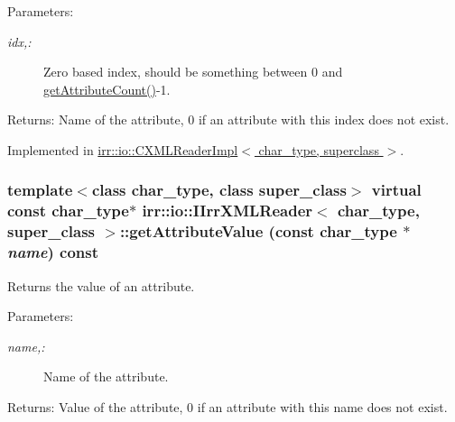 \begin{Desc}
\item[Parameters:]
\begin{description}
\item[{\em idx,:}]Zero based index, should be something between 0 and \hyperlink{classirr_1_1io_1_1_i_irr_x_m_l_reader_eaa1cfc860be7b788f78edec403cc2a2}{getAttributeCount()}-1. \end{description}
\end{Desc}
\begin{Desc}
\item[Returns:]Name of the attribute, 0 if an attribute with this index does not exist. \end{Desc}


Implemented in \hyperlink{classirr_1_1io_1_1_c_x_m_l_reader_impl_fc1f65d70219634fc005a6048f898fb3}{irr::io::CXMLReaderImpl$<$ char\_\-type, superclass $>$}.\hypertarget{classirr_1_1io_1_1_i_irr_x_m_l_reader_daac9a49b396e7fc2d335335f36391a9}{
\subsubsection[{getAttributeValue}]{\setlength{\rightskip}{0pt plus 5cm}template$<$class char\_\-type, class super\_\-class$>$ virtual const char\_\-type$\ast$ {\bf irr::io::IIrrXMLReader}$<$ char\_\-type, super\_\-class $>$::getAttributeValue (const char\_\-type $\ast$ {\em name}) const}}
\label{classirr_1_1io_1_1_i_irr_x_m_l_reader_daac9a49b396e7fc2d335335f36391a9}


Returns the value of an attribute. 

\begin{Desc}
\item[Parameters:]
\begin{description}
\item[{\em name,:}]Name of the attribute. \end{description}
\end{Desc}
\begin{Desc}
\item[Returns:]Value of the attribute, 0 if an attribute with this name does not exist. \end{Desc}


